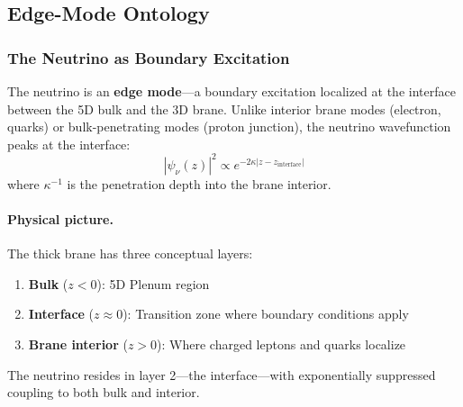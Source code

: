 \subsection{Edge-Mode Ontology}
\label{sec:ch6_ontology}

\subsubsection{The Neutrino as Boundary Excitation}

\begin{postulate}
\label{post:ch6_neutrino_edge}
The neutrino is an \textbf{edge mode}---a boundary excitation localized at the
interface between the 5D bulk and the 3D brane. Unlike interior brane modes
(electron, quarks) or bulk-penetrating modes (proton junction), the neutrino
wavefunction peaks at the interface:
\begin{equation}
    |\psi_\nu(z)|^2 \propto e^{-2\kappa |z - z_{\text{interface}}|}
    \label{eq:ch6_edge_profile}
\end{equation}
where $\kappa^{-1}$ is the penetration depth into the brane interior.
\end{postulate}

\paragraph{Physical picture.}
The thick brane has three conceptual layers:
\begin{enumerate}[nosep]
    \item \textbf{Bulk} ($z < 0$): 5D Plenum region
    \item \textbf{Interface} ($z \approx 0$): Transition zone where boundary conditions apply
    \item \textbf{Brane interior} ($z > 0$): Where charged leptons and quarks localize
\end{enumerate}
The neutrino resides in layer 2---the interface---with exponentially suppressed
coupling to both bulk and interior.

